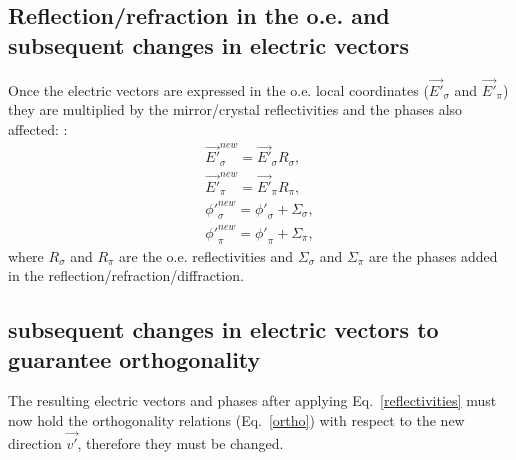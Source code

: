 \documentclass{iucr}
\begin{document}
\subsection{Reflection/refraction in the o.e. and subsequent changes in electric vectors}
\label{sec:reflection}

Once the electric vectors are expressed in the o.e. local coordinates ($\vec{E'}_\sigma$ and 
$\vec{E'}_\pi$) they are multiplied by the mirror/crystal reflectivities and the phases also affected: : 
\begin{eqnarray}
 \label{reflectivities}
 \vec{E'}_\sigma^{new} = \vec{E'}_\sigma R_\sigma, \nonumber \\
 \vec{E'}_\pi^{new} = \vec{E'}_\pi R_\pi, \nonumber \\
 {\phi '}_\sigma^{new} = {\phi '}_\sigma + \Sigma_\sigma, \nonumber \\
 {\phi '}_\pi^{new} = {\phi '}_\pi + \Sigma_\pi,
\end{eqnarray}
where $R_\sigma$ and $R_\pi$ are the o.e. reflectivities and $\Sigma_\sigma$ and $\Sigma_\pi$ are the  phases added in the reflection/refraction/diffraction. 

\subsection{subsequent changes in electric vectors to guarantee orthogonality}
\label{sec:orthogonality}

The resulting electric vectors and phases after applying Eq.~\ref{reflectivities} must now hold the orthogonality relations (Eq.~\ref{ortho}) with respect to the new direction $\vec{v'}$, therefore they must be changed. 

\end{document}
